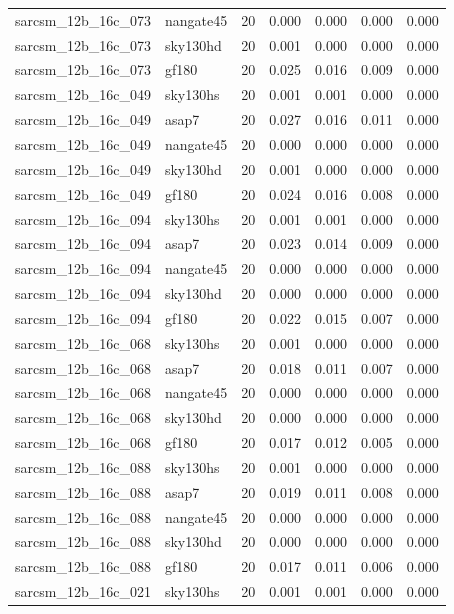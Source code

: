 \begin{tabular}{llrrrrr}
sarcsm\_12b\_16c\_073 & nangate45 & 20 & 0.000 & 0.000 & 0.000 & 0.000 \\
sarcsm\_12b\_16c\_073 & sky130hd & 20 & 0.001 & 0.000 & 0.000 & 0.000 \\
sarcsm\_12b\_16c\_073 & gf180 & 20 & 0.025 & 0.016 & 0.009 & 0.000 \\
sarcsm\_12b\_16c\_049 & sky130hs & 20 & 0.001 & 0.001 & 0.000 & 0.000 \\
sarcsm\_12b\_16c\_049 & asap7 & 20 & 0.027 & 0.016 & 0.011 & 0.000 \\
sarcsm\_12b\_16c\_049 & nangate45 & 20 & 0.000 & 0.000 & 0.000 & 0.000 \\
sarcsm\_12b\_16c\_049 & sky130hd & 20 & 0.001 & 0.000 & 0.000 & 0.000 \\
sarcsm\_12b\_16c\_049 & gf180 & 20 & 0.024 & 0.016 & 0.008 & 0.000 \\
sarcsm\_12b\_16c\_094 & sky130hs & 20 & 0.001 & 0.001 & 0.000 & 0.000 \\
sarcsm\_12b\_16c\_094 & asap7 & 20 & 0.023 & 0.014 & 0.009 & 0.000 \\
sarcsm\_12b\_16c\_094 & nangate45 & 20 & 0.000 & 0.000 & 0.000 & 0.000 \\
sarcsm\_12b\_16c\_094 & sky130hd & 20 & 0.000 & 0.000 & 0.000 & 0.000 \\
sarcsm\_12b\_16c\_094 & gf180 & 20 & 0.022 & 0.015 & 0.007 & 0.000 \\
sarcsm\_12b\_16c\_068 & sky130hs & 20 & 0.001 & 0.000 & 0.000 & 0.000 \\
sarcsm\_12b\_16c\_068 & asap7 & 20 & 0.018 & 0.011 & 0.007 & 0.000 \\
sarcsm\_12b\_16c\_068 & nangate45 & 20 & 0.000 & 0.000 & 0.000 & 0.000 \\
sarcsm\_12b\_16c\_068 & sky130hd & 20 & 0.000 & 0.000 & 0.000 & 0.000 \\
sarcsm\_12b\_16c\_068 & gf180 & 20 & 0.017 & 0.012 & 0.005 & 0.000 \\
sarcsm\_12b\_16c\_088 & sky130hs & 20 & 0.001 & 0.000 & 0.000 & 0.000 \\
sarcsm\_12b\_16c\_088 & asap7 & 20 & 0.019 & 0.011 & 0.008 & 0.000 \\
sarcsm\_12b\_16c\_088 & nangate45 & 20 & 0.000 & 0.000 & 0.000 & 0.000 \\
sarcsm\_12b\_16c\_088 & sky130hd & 20 & 0.000 & 0.000 & 0.000 & 0.000 \\
sarcsm\_12b\_16c\_088 & gf180 & 20 & 0.017 & 0.011 & 0.006 & 0.000 \\
sarcsm\_12b\_16c\_021 & sky130hs & 20 & 0.001 & 0.001 & 0.000 & 0.000 \\

\end{tabular}
